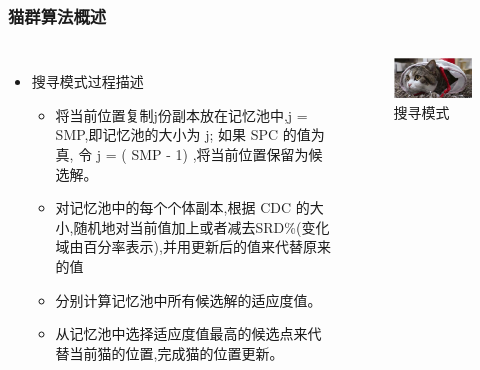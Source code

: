 \begin{frame}
	\frametitle{猫群算法概述}
	\begin{columns}
		\begin{itemize}
			\item {搜寻模式过程描述}
				\begin{itemize}
					\item {将当前位置复制j份副本放在记忆池中,j = SMP,即记忆池的大小为 j; 如果 SPC 的值为真, 令 j = ( SMP - 1) ,将当前位置保留为候选解。}
					\item {对记忆池中的每个个体副本,根据 CDC 的大小,随机地对当前值加上或者减去SRD\%(变化域由百分率表示),并用更新后的值来代替原来的值}
					\item {分别计算记忆池中所有候选解的适应度值。}
					\item {从记忆池中选择适应度值最高的候选点来代替当前猫的位置,完成猫的位置更新。}	
				\end{itemize}
		\end{itemize}
		\begin{figure}[htbp]
			\centering
			\includegraphics[width=6cm]{pic/cat1.png}
			\caption{搜寻模式}
		\end{figure}
	\end{columns}
\end{frame}

